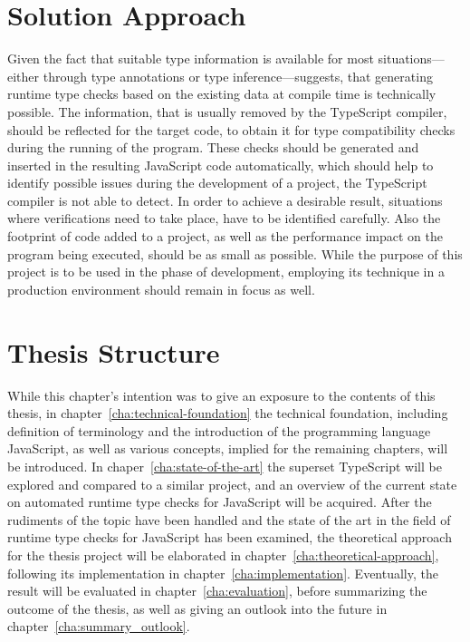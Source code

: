 \section{Solution Approach}
\label{sec:solution-approach}

Given the fact that suitable type information is available for most situations---either through type annotations or type inference---suggests, that generating runtime type checks based on the existing data at compile time is technically possible. The information, that is usually removed by the TypeScript compiler, should be reflected for the target code, to obtain it for type compatibility checks during the running of the program. These checks should be generated and inserted in the resulting JavaScript code automatically, which should help to identify possible issues during the development of a project, the TypeScript compiler is not able to detect. In order to achieve a desirable result, situations where verifications need to take place, have to be identified carefully. Also the footprint of code added to a project, as well as the performance impact on the program being executed, should be as small as possible. While the purpose of this project is to be used in the phase of development, employing its technique in a production environment should remain in focus as well.

\section{Thesis Structure}
\label{sec:thesis-structure}

While this chapter's intention was to give an exposure to the contents of this thesis, in chapter~\ref{cha:technical-foundation} the technical foundation, including definition of terminology and the introduction of the programming language JavaScript, as well as various concepts, implied for the remaining chapters, will be introduced. In chaper~\ref{cha:state-of-the-art} the superset TypeScript will be explored and compared to a similar project, and an overview of the current state on automated runtime type checks for JavaScript will be acquired. After the rudiments of the topic have been handled and the state of the art in the field of runtime type checks for JavaScript has been examined, the theoretical approach for the thesis project will be elaborated in chapter~\ref{cha:theoretical-approach}, following its implementation in chapter~\ref{cha:implementation}. Eventually, the result will be evaluated in chapter~\ref{cha:evaluation}, before summarizing the outcome of the thesis, as well as giving an outlook into the future in chapter~\ref{cha:summary_outlook}.
